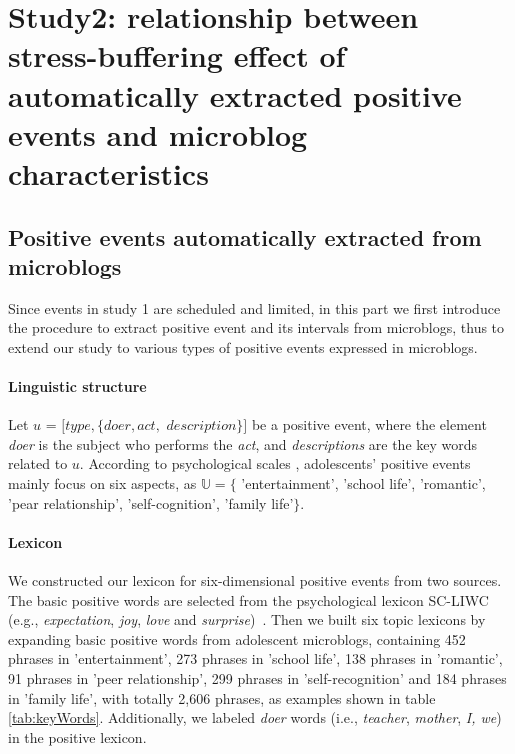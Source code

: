 \section{Study2: relationship between stress-buffering effect of automatically extracted positive events and microblog characteristics}

\subsection{Positive events automatically extracted from microblogs}
Since events in study 1 are scheduled and limited,
in this part we first introduce the procedure to extract positive event and its intervals from microblogs,
thus to extend our study to various types of positive events expressed in microblogs.

\paragraph{Linguistic structure}
Let $u$ = $[type,\{doer, act,$ $description\}]$ be a positive event,
where the element \emph{doer} is the subject who performs the \emph{act},
and \emph{descriptions} are the key words related to $u$.
According to psychological scales \citep{hassles,Jun2008Influence},
adolescents' positive events mainly focus on six aspects,
as $\mathbb{U} =\{$ 'entertainment', 'school life', 'romantic', 'pear relationship', 'self-cognition', 'family life'$\}$.

\paragraph{Lexicon}
We constructed our lexicon for six-dimensional positive events from two sources.
The basic positive words are selected from the psychological lexicon SC-LIWC (e.g., \emph{expectation}, \emph{joy}, \emph{love} and \emph{surprise})~\citep{Tausczik2010The}.
Then we built six topic lexicons by expanding basic positive words from adolescent microblogs,
containing 452 phrases in 'entertainment',
273 phrases in 'school life',
138 phrases in 'romantic',
91 phrases in 'peer relationship',
299 phrases in 'self-recognition' and 184 phrases in 'family life', with totally 2,606 phrases,
as examples shown in table \ref{tab:keyWords}.
Additionally, we labeled \emph{doer} words (i.e., \emph{teacher}, \emph{mother}, \emph{I, we}) in the positive lexicon.


